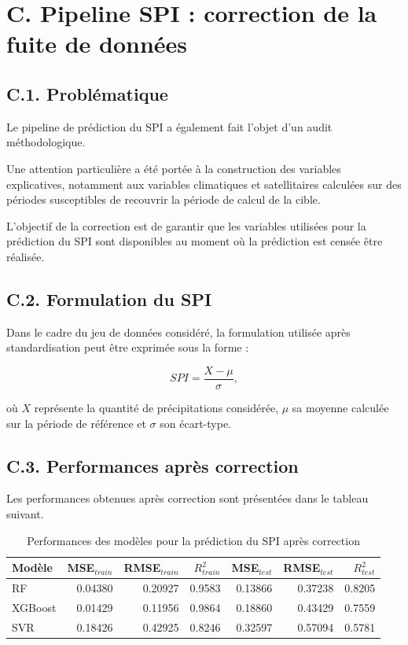 \section*{C. Pipeline SPI : correction de la fuite de données}

\subsection*{C.1. Problématique}

Le pipeline de prédiction du SPI a également fait l'objet d'un audit
méthodologique.

Une attention particulière a été portée à la construction des variables
explicatives, notamment aux variables climatiques et satellitaires calculées
sur des périodes susceptibles de recouvrir la période de calcul de la cible.

L'objectif de la correction est de garantir que les variables utilisées pour
la prédiction du SPI sont disponibles au moment où la prédiction est censée
être réalisée.

\subsection*{C.2. Formulation du SPI}

Dans le cadre du jeu de données considéré, la formulation utilisée après
standardisation peut être exprimée sous la forme :

\begin{equation}
SPI = \frac{X-\mu}{\sigma},
\end{equation}

où $X$ représente la quantité de précipitations considérée, $\mu$ sa moyenne
calculée sur la période de référence et $\sigma$ son écart-type.

\subsection*{C.3. Performances après correction}

Les performances obtenues après correction sont présentées dans le tableau
suivant.

\begin{table}[htbp]
\centering
\caption{Performances des modèles pour la prédiction du SPI après correction}
\begin{tabular}{lrrrrrr}
\hline
Modèle &
MSE$_{train}$ &
RMSE$_{train}$ &
$R^2_{train}$ &
MSE$_{test}$ &
RMSE$_{test}$ &
$R^2_{test}$ \\
\hline
RF &
0.04380 &
0.20927 &
0.9583 &
0.13866 &
0.37238 &
0.8205 \\
XGBoost &
0.01429 &
0.11956 &
0.9864 &
0.18860 &
0.43429 &
0.7559 \\
SVR &
0.18426 &
0.42925 &
0.8246 &
0.32597 &
0.57094 &
0.5781 \\
\hline
\end{tabular}
\end{table}

